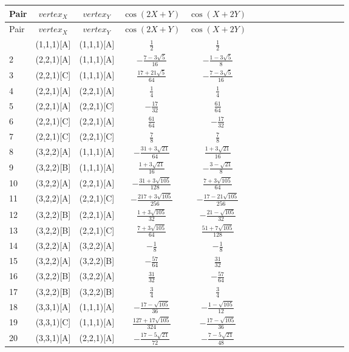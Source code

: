 \documentclass[11pt]{article}
\begin{document}
\begin{longtable}{ | p{1cm}| *{15}{c|} }
\hline
Pair & $vertex_X$ & $vertex_Y$ & $\cos(2X+Y)$ & $\cos(X+2Y)$ \\
\hline\endhead
\hline
Pair & $vertex_X$ & $vertex_Y$ & $\cos(2X+Y)$ & $\cos(X+2Y)$ \\
\hline\endfoot
1 & (1,1,1)[A] & (1,1,1)[A] & $\frac{1}{2}$ & $\frac{1}{2}$\\
2 & (2,2,1)[A] & (1,1,1)[A] & $-\frac{7-3\sqrt{5}}{16}$ & $-\frac{1-3\sqrt{5}}{8}$\\
3 & (2,2,1)[C] & (1,1,1)[A] & $\frac{17+21\sqrt{5}}{64}$ & $-\frac{7-3\sqrt{5}}{16}$\\
4 & (2,2,1)[A] & (2,2,1)[A] & $\frac{1}{4}$ & $\frac{1}{4}$\\
5 & (2,2,1)[A] & (2,2,1)[C] & $-\frac{17}{32}$ & $\frac{61}{64}$\\
6 & (2,2,1)[C] & (2,2,1)[A] & $\frac{61}{64}$ & $-\frac{17}{32}$\\
7 & (2,2,1)[C] & (2,2,1)[C] & $\frac{7}{8}$ & $\frac{7}{8}$\\
8 & (3,2,2)[A] & (1,1,1)[A] & $-\frac{31+3\sqrt{21}}{64}$ & $\frac{1+3\sqrt{21}}{16}$\\
9 & (3,2,2)[B] & (1,1,1)[A] & $\frac{1+3\sqrt{21}}{16}$ & $-\frac{3-\sqrt{21}}{8}$\\
10 & (3,2,2)[A] & (2,2,1)[A] & $-\frac{31+3\sqrt{105}}{128}$ & $\frac{7+3\sqrt{105}}{64}$\\
11 & (3,2,2)[A] & (2,2,1)[C] & $-\frac{217+3\sqrt{105}}{256}$ & $-\frac{17-21\sqrt{105}}{256}$\\
12 & (3,2,2)[B] & (2,2,1)[A] & $\frac{1+3\sqrt{105}}{32}$ & $-\frac{21-\sqrt{105}}{32}$\\
13 & (3,2,2)[B] & (2,2,1)[C] & $\frac{7+3\sqrt{105}}{64}$ & $\frac{51+7\sqrt{105}}{128}$\\
14 & (3,2,2)[A] & (3,2,2)[A] & $-\frac{1}{8}$ & $-\frac{1}{8}$\\
15 & (3,2,2)[A] & (3,2,2)[B] & $-\frac{57}{64}$ & $\frac{31}{32}$\\
16 & (3,2,2)[B] & (3,2,2)[A] & $\frac{31}{32}$ & $-\frac{57}{64}$\\
17 & (3,2,2)[B] & (3,2,2)[B] & $\frac{3}{4}$ & $\frac{3}{4}$\\
18 & (3,3,1)[A] & (1,1,1)[A] & $-\frac{17-\sqrt{105}}{36}$ & $-\frac{1-\sqrt{105}}{12}$\\
19 & (3,3,1)[C] & (1,1,1)[A] & $\frac{127+17\sqrt{105}}{324}$ & $-\frac{17-\sqrt{105}}{36}$\\
20 & (3,3,1)[A] & (2,2,1)[A] & $-\frac{17-5\sqrt{21}}{72}$ & $-\frac{7-5\sqrt{21}}{48}$\\

\end{longtable}
\end{document}
